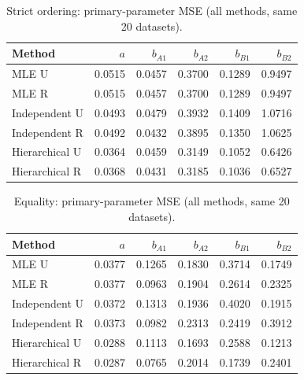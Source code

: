 \documentclass[a4paper,11pt]{article}
\begin{document}
\begin{table}[htbp]\centering\small
\caption{Strict ordering: primary-parameter MSE (all methods, same 20 datasets).}\label{tab:mse-strict}
\begin{tabular}{lrrrrr}\toprule
Method & $a$ & $b_{A1}$ & $b_{A2}$ & $b_{B1}$ & $b_{B2}$\\\midrule
MLE U & 0.0515 & 0.0457 & 0.3700 & 0.1289 & 0.9497\\
MLE R & 0.0515 & 0.0457 & 0.3700 & 0.1289 & 0.9497\\
Independent U & 0.0493 & 0.0479 & 0.3932 & 0.1409 & 1.0716\\
Independent R & 0.0492 & 0.0432 & 0.3895 & 0.1350 & 1.0625\\
Hierarchical U & 0.0364 & 0.0459 & 0.3149 & 0.1052 & 0.6426\\
Hierarchical R & 0.0368 & 0.0431 & 0.3185 & 0.1036 & 0.6527\\
\bottomrule\end{tabular}
\end{table}

\begin{table}[htbp]\centering\small
\caption{Equality: primary-parameter MSE (all methods, same 20 datasets).}\label{tab:mse-equality}
\begin{tabular}{lrrrrr}\toprule
Method & $a$ & $b_{A1}$ & $b_{A2}$ & $b_{B1}$ & $b_{B2}$\\\midrule
MLE U & 0.0377 & 0.1265 & 0.1830 & 0.3714 & 0.1749\\
MLE R & 0.0377 & 0.0963 & 0.1904 & 0.2614 & 0.2325\\
Independent U & 0.0372 & 0.1313 & 0.1936 & 0.4020 & 0.1915\\
Independent R & 0.0373 & 0.0982 & 0.2313 & 0.2419 & 0.3912\\
Hierarchical U & 0.0288 & 0.1113 & 0.1693 & 0.2588 & 0.1213\\
Hierarchical R & 0.0287 & 0.0765 & 0.2014 & 0.1739 & 0.2401\\
\bottomrule\end{tabular}
\end{table}
\end{document}
